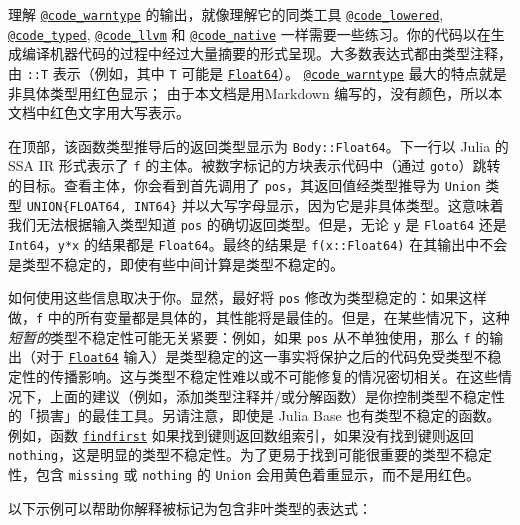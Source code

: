 理解 \hyperlink{8092893264277772840}{\texttt{@code\_warntype}} 的输出，就像理解它的同类工具 \hyperlink{1376948972689074219}{\texttt{@code\_lowered}}, \hyperlink{6823997547688846780}{\texttt{@code\_typed}}, \href{@ ref}{\texttt{@code\_llvm}} 和 \hyperlink{2629340111434042067}{\texttt{@code\_native}} 一样需要一些练习。你的代码以在生成编译机器代码的过程中经过大量摘要的形式呈现。大多数表达式都由类型注释，由 \texttt{::T} 表示（例如，其中 \texttt{T} 可能是 \hyperlink{5027751419500983000}{\texttt{Float64}}）。 \hyperlink{8092893264277772840}{\texttt{@code\_warntype}} 最大的特点就是非具体类型用红色显示； 由于本文档是用Markdown 编写的，没有颜色，所以本文档中红色文字用大写表示。



在顶部，该函数类型推导后的返回类型显示为 \texttt{Body::Float64}。下一行以 Julia 的 SSA IR 形式表示了 \texttt{f} 的主体。被数字标记的方块表示代码中（通过 \texttt{goto}）跳转的目标。查看主体，你会看到首先调用了 \texttt{pos}，其返回值经类型推导为 \texttt{Union} 类型 \texttt{UNION\{FLOAT64, INT64\}} 并以大写字母显示，因为它是非具体类型。这意味着我们无法根据输入类型知道 \texttt{pos} 的确切返回类型。但是，无论 \texttt{y} 是 \texttt{Float64} 还是 \texttt{Int64}，\texttt{y*x} 的结果都是 \texttt{Float64}。最终的结果是 \texttt{f(x::Float64)} 在其输出中不会是类型不稳定的，即使有些中间计算是类型不稳定的。



如何使用这些信息取决于你。显然，最好将 \texttt{pos} 修改为类型稳定的：如果这样做，\texttt{f} 中的所有变量都是具体的，其性能将是最佳的。但是，在某些情况下，这种\emph{短暂的}类型不稳定性可能无关紧要：例如，如果 \texttt{pos} 从不单独使用，那么 \texttt{f} 的输出（对于 \hyperlink{5027751419500983000}{\texttt{Float64}} 输入）是类型稳定的这一事实将保护之后的代码免受类型不稳定性的传播影响。这与类型不稳定性难以或不可能修复的情况密切相关。在这些情况下，上面的建议（例如，添加类型注释并/或分解函数）是你控制类型不稳定性的「损害」的最佳工具。另请注意，即使是 Julia Base 也有类型不稳定的函数。例如，函数 \hyperlink{13752961745140943082}{\texttt{findfirst}} 如果找到键则返回数组索引，如果没有找到键则返回 \texttt{nothing}，这是明显的类型不稳定性。为了更易于找到可能很重要的类型不稳定性，包含 \texttt{missing} 或 \texttt{nothing} 的 \texttt{Union} 会用黄色着重显示，而不是用红色。



以下示例可以帮助你解释被标记为包含非叶类型的表达式：




